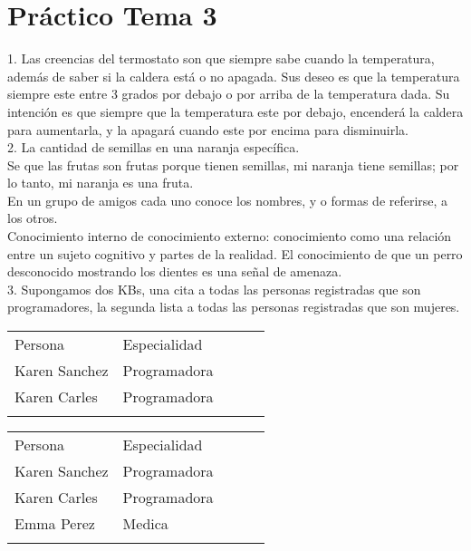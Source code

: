 \chapter{Práctico Tema 3}

1. Las creencias del termostato son que siempre sabe cuando la temperatura, además de saber si la caldera está o no apagada. Sus deseo es que la temperatura siempre este entre 3 grados por debajo o por arriba de la temperatura dada. Su intención es que siempre que la temperatura este por debajo, encenderá la caldera para aumentarla, y la apagará cuando este por encima para disminuirla. \\


2. La cantidad de semillas en una naranja específica. \\

Se que las frutas son frutas porque tienen semillas, mi naranja tiene semillas; por lo tanto, mi naranja es una fruta. \\

En un grupo de amigos cada uno conoce los nombres, y o formas de referirse, a los otros. \\

Conocimiento interno de conocimiento externo: conocimiento como una relación entre un sujeto cognitivo y partes de la realidad. 
El conocimiento de que un perro desconocido mostrando los dientes es una señal de amenaza. \\

3. Supongamos dos KBs, una cita a todas las personas registradas que son programadores, la segunda lista a todas las personas registradas que son mujeres.

\begin{table}[]
	\begin{tabular}{lllll}
		Persona       & Especialidad &  &  &  \\
		Karen Sanchez & Programadora &  &  &  \\
		Karen Carles & Programadora  &  &  &  \\
		&              &  &  & 
	\end{tabular}
\end{table}


\begin{table}[]
	\begin{tabular}{lllll}
		Persona       & Especialidad &  &  &  \\
		Karen Sanchez & Programadora &  &  &  \\
		Karen Carles & Programadora  &  &  &  \\
		Emma Perez & Medica       &  &  &  \\
		&              &  &  & 
	\end{tabular}
\end{table}

